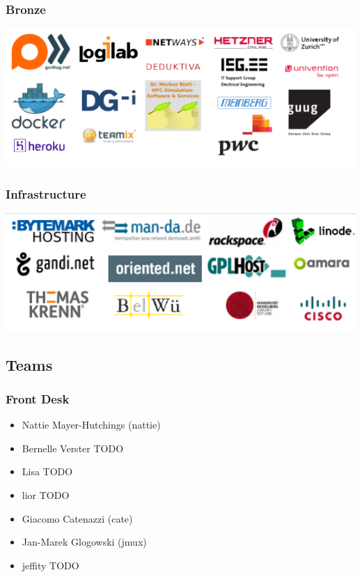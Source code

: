 \documentclass[t]{beamer}
\begin{document}
\begin{frame}
	\frametitle{Bronze}
	\begin{center}
	\includegraphics[scale=0.7]{images2/sponsors/bronze2.pdf}
	\end{center}
\end{frame}

\begin{frame}
	\frametitle{Infrastructure}
	\begin{center}
	\includegraphics[scale=0.7]{images2/sponsors/infrastructure.pdf}
	\end{center}

\end{frame}

\subsection{Teams}

\begin{frame}
	\frametitle{Front Desk}
	\begin{itemize}
		\item Nattie Mayer-Hutchings (nattie)
		\item Bernelle Verster TODO
		\item Lisa TODO
		\item lior TODO
		\item Giacomo Catenazzi (cate)
		\item Jan-Marek Glogowski (jmux)
		\item jeffity TODO
	\end{itemize}
\end{frame}
\end{document}
